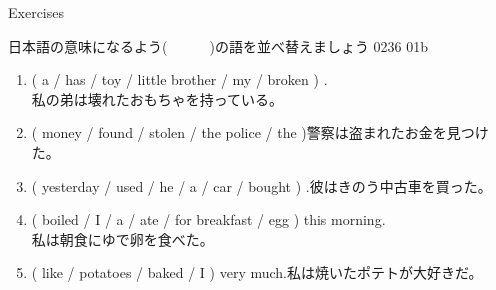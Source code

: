 \documentclass[aspectratio=169,xcolor={dvipsnames,table}]{beamer}
\begin{document}
\begin{frame}[plain,t]{Exercises}

  {\small 日本語の意味になるよう(~~~~~~)の語を並べ替えましょう}%
  \hfill{\tiny 0236}\,{\scriptsize {}}\,{\tiny 01b}

  \begin{enumerate}
    \item  ( a / has / toy / little brother / my / broken ) .\\\hfill{\small 私の弟は壊れたおもちゃを持っている。}\\
    \item  ( money / found / stolen / the police / the )\hfill{\small 警察は盗まれたお金を見つけた。}\\
    \item  ( yesterday / used / he / a / car / bought ) .\hfill{\small 彼はきのう中古車を買った。}\\
    \item  ( boiled / I / a / ate / for breakfast / egg ) this morning.\\\hfill{\small 私は朝食にゆで卵を食べた。}\\
    \item  ( like / potatoes / baked / I  ) very much.\hfill{\small 私は焼いたポテトが大好きだ。}\\
  \end{enumerate}
\end{frame}
\end{document}
